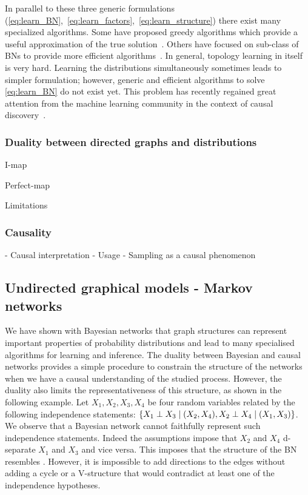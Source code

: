 In parallel to these three generic formulations (\ref{eq:learn_BN},~\ref{eq:learn_factors},~\ref{eq:learn_structure}) there exist many specialized algorithms. Some have proposed greedy algorithms which provide a useful approximation of the true solution~\citep{}. Others have focused on sub-class of BNs to provide more efficient algorithms~\citep{}. In general, topology learning in itself is very hard. Learning the distributions simultaneously sometimes leads to simpler formulation; however, generic and efficient algorithms to solve \eqref{eq:learn_BN} do not exist yet. This problem has recently regained great attention from the machine learning community in the context of causal discovery~\citep{}.


\subsubsection{Duality between directed graphs and distributions}
I-map

Perfect-map

Limitations
\subsubsection{Causality}
- Causal interpretation
- Usage
- Sampling as a causal phenomenon
\subsection{Undirected graphical models - Markov networks}
We have shown with Bayesian networks that graph structures can represent important properties of probability distributions and lead to many specialised algorithms for learning and inference. The duality between Bayesian and causal networks provides a simple procedure to constrain the structure of the networks when we have a causal understanding of the studied process. However, the duality also limits the representativeness of this structure, as shown in the following example. Let $X_1, X_2, X_3, X_4$ be four random variables related by the following independence statements: $\{ X_1 \perp X_3 \mid (X_2, X_4), X_2 \perp X_4 \mid (X_1, X_3)\}$. We observe that a Bayesian network cannot faithfully represent such independence statements. Indeed the assumptions impose that $X_2$ and $X_4$ d-separate $X_1$ and $X_3$ and vice versa. This imposes that the structure of the BN resembles . However, it is impossible to add directions to the edges without adding a cycle or a V-structure that would contradict at least one of the independence hypotheses.


